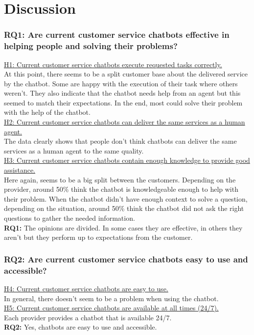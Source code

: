 \section{Discussion}
\subsubsection{RQ1: Are current customer service chatbots effective in helping people and
	solving their problems?}
\ul{H1: Current customer service chatbots execute requested tasks correctly.}\\
At this point, there seems to be a split customer base about the delivered service by the chatbot. Some are happy with the execution of their task where others weren't. They also indicate that the chatbot needs help from an agent but this seemed to match their expectations. In the end, most could solve their problem with the help of the chatbot.\\
\break
\ul{H2: Current customer service chatbots can deliver the same services as a human
	agent.}\\
The data clearly shows that people don't think chatbots can deliver the same services as a human agent to the same quality.\\
\break
\ul{H3: Current customer service chatbots contain enough knowledge to provide good
	assistance.}\\
Here again, seems to be a big split between the customers. Depending on the provider, around 50\% think the chatbot is knowledgeable enough to help with their problem. When the chatbot didn't have enough context to solve a question, depending on the situation, around 50\% think the chatbot did not ask the right questions to gather the needed information.\\
\break
\textbf{RQ1:} The opinions are divided. In some cases they are effective, in others they aren't but they perform up to expectations from the customer.\\
\subsubsection{RQ2: Are current customer service chatbots easy to use and accessible?}
\ul{H4: Current customer service chatbots are easy to use.}\\
In general, there doesn't seem to be a problem when using the chatbot.\\
\break
\ul{H5: Current customer service chatbots are available at all times (24/7).}\\
Each provider provides a chatbot that is available 24/7.\\
\break
\textbf{RQ2:} Yes, chatbots are easy to use and accessible.\\
